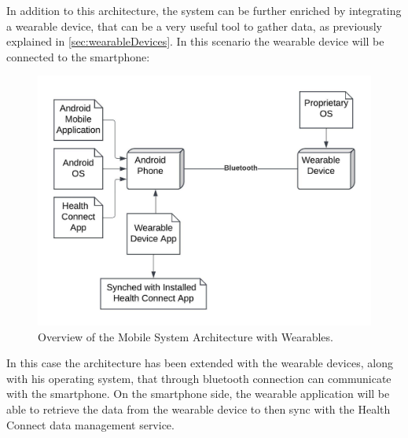 \noindent In addition to this architecture, the system can be further enriched by integrating a wearable device, that can be a very useful tool to gather data, as previously explained in \cref{sec:wearableDevices}. In this scenario the wearable device will be connected to the smartphone:

\begin{figure}
    \includegraphics[width=1.0\linewidth]{./images/system_architecture_wearable.jpeg}
    \caption{Overview of the Mobile System Architecture with Wearables.}
    \label{fig:systemArchitectureWearables}
\end{figure}

\noindent In this case the architecture has been extended with the wearable devices, along with his operating system, that through bluetooth connection can communicate with the smartphone. On the smartphone side, the wearable application will be able to retrieve the data from the wearable device to then sync with the Health Connect data management service.
